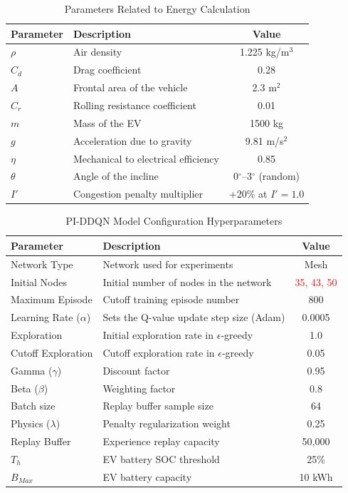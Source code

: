 \documentclass[conference]{IEEEtran}
\begin{document}
\begin{table}[htbp]
\centering
\caption{Parameters Related to Energy Calculation}
\label{tab:physics_params}
\renewcommand{\arraystretch}{1.2} 
\setlength{\tabcolsep}{5pt}
\small
\begin{tabular}{|l|p{3.2cm}|c|}
\hline
\textbf{Parameter} & \textbf{Description} & \textbf{Value} \\ \hline
$\rho$ & Air density & 1.225 kg/m$^3$ \\ \hline
$C_d$ & Drag coefficient & 0.28 \\ \hline
$A$ & Frontal area of the vehicle & 2.3 m$^2$ \\ \hline
$C_r$ & Rolling resistance coefficient & 0.01 \\ \hline
$m$ & Mass of the EV & 1500 kg \\ \hline
$g$ & Acceleration due to gravity & 9.81 m/s$^2$ \\ \hline
$\eta$ & Mechanical to electrical efficiency & 0.85 \\ \hline
$\theta$ & Angle of the incline & 0$^\circ$--3$^\circ$ (random) \\ \hline
$I'$ & Congestion penalty multiplier & +20\% at $I'=1.0$ \\ \hline
\end{tabular}
\end{table}

\begin{table}[htbp]
\centering
\caption{PI-DDQN Model Configuration Hyperparameters}
\label{tab:piddqn_hyperparameters}
\renewcommand{\arraystretch}{1.15}
\setlength{\tabcolsep}{6pt}
\small
\begin{tabular}{|l|p{4.75cm}|c|}
\hline
\textbf{Parameter} & \textbf{Description} & \textbf{Value} \\ \hline
Network Type & Network used for experiments & Mesh \\ \hline
Initial Nodes & Initial number of nodes in the network & \textcolor{red}{35, 43, 50} \\ \hline
Maximum Episode & Cutoff training episode number & 800 \\ \hline
Learning Rate ($\alpha$) & Sets the Q-value update step size (Adam) & 0.0005 \\ \hline
Exploration & Initial exploration rate in $\epsilon$-greedy & 1.0 \\ \hline
Cutoff Exploration & Cutoff exploration rate in $\epsilon$-greedy & 0.05 \\ \hline
Gamma ($\gamma$) & Discount factor & 0.95 \\ \hline
Beta ($\beta$) & Weighting factor & 0.8 \\ \hline
Batch size & Replay buffer sample size & 64 \\ \hline
Physics ($\lambda$) & Penalty regularization weight & 0.25 \\ \hline
Replay Buffer & Experience replay capacity & 50,000 \\ \hline
$T_h$ & EV battery SOC threshold & 25\% \\ \hline
$B_{Max}$ & EV battery capacity & 10 kWh \\ \hline
\end{tabular}
\end{table}
\end{document}

